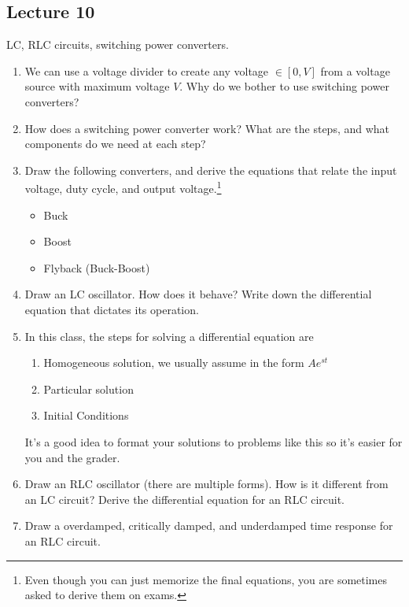 \subsection*{Lecture 10}
LC, RLC circuits, switching power converters.

\begin{enumerate}
  \item We can use a voltage divider to create any voltage $\in [0, V]$ from
  a voltage source with maximum voltage $V$. Why do we bother to use
  switching power converters?
  \item How does a switching power converter work? What are the steps, and
  what components do we need at each step?
  \item Draw the following converters, and derive the equations that relate
  the input voltage, duty cycle, and output voltage.\footnote{Even though you
  can just memorize the final equations, you are sometimes asked to derive
  them on exams.}
  \begin{itemize}
    \item Buck
    \item Boost
    \item Flyback (Buck-Boost)
  \end{itemize}
  \item Draw an LC oscillator. How does it behave? Write down the
  differential equation that dictates its operation.
  \item In this class, the steps for solving a differential equation are 
  \begin{enumerate}[label=\arabic*.]
    \item Homogeneous solution, we usually assume in the form $Ae^{st}$
    \item Particular solution
    \item Initial Conditions
  \end{enumerate}
  It's a good idea to format your solutions to problems like this so it's
  easier for you and the grader.
  \item Draw an RLC oscillator (there are multiple forms). How is it
	different from an LC circuit? Derive the differential equation for an RLC circuit.
	\item Draw a overdamped, critically damped, and underdamped time response for an RLC circuit.
\end{enumerate}

